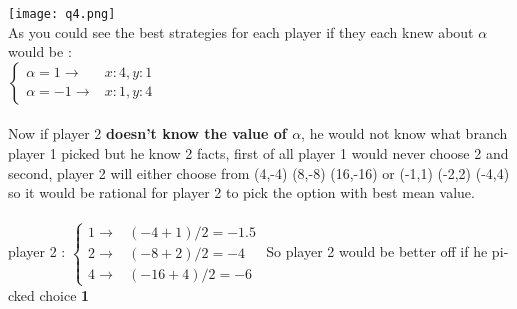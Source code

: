 \begin{latin}
    \texttt{[image: q4.png]}
    \\
    As you could see the best strategies for each player if they each knew about $\alpha$ would be : \\
    $
    \begin{cases}
            \alpha = 1  \rightarrow 
               & x:4, y:1
               \\[1ex]
            \alpha = -1  \rightarrow 
               & x:1, y:4
    \end{cases}
    $ \\ \\ 
    Now if player 2 \textbf{doesn't know the value of $\alpha$}, he would not know what branch player 1 picked but he know 2 facts, first of all player 1 would never choose 2 and second, player 2 will either choose from (4,-4) (8,-8) (16,-16) or (-1,1) (-2,2) (-4,4) so it would be rational for 
    player 2 to pick the option with best mean value.\\\\
    player 2 : 
    $
    \begin{cases}
      1 \rightarrow 
         & (-4 + 1)/2 = -1.5
         \\[1ex]
      2  \rightarrow 
         & (-8 + 2)/2 = -4
         \\[1ex]
      4 \rightarrow
        & (-16 + 4)/2 = -6
\end{cases}
    $
  So player 2 would be better off if he picked choice \textbf{1}
\end{latin}
 